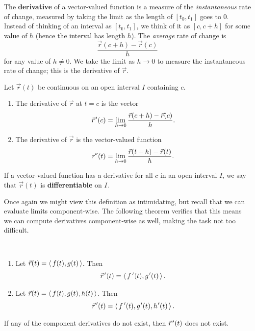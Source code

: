 The \textbf{derivative} of a vector-valued function is a measure of the \emph{instantaneous} rate of change, measured by taking the limit as the length of $[t_0,t_1]$ goes to 0. Instead of thinking of an interval as $[t_0,t_1]$, we think of it as $[c,c+h]$ for some value of $h$ (hence the interval has length $h$).  The \emph{average} rate of change is 
\[\frac{\vec r(c+h)-\vec r(c)}{h}\]
for any value of $h\neq0$. We take the limit as $h\to0$ to measure the instantaneous rate of change; this is the derivative of $\vec r$.


\begin{definition}\label{def:vvf_derivative}%
Let $\vec r(t)$ be continuous on an open interval $I$ containing $c$.
\begin{enumerate}
	\item The derivative of $\vec r$ at $t=c$ is the vector
	\[\vec r\hskip1.25pt ' (c) = \lim_{h\to 0} \frac{\vec r(c+h) - \vec r(c)}{h}.\]
	\item	The derivative of $\vec r$ is the vector-valued function
	\[\vec r\hskip1.25pt ' (t) = \lim_{h\to 0} \frac{\vec r(t+h) - \vec r(t)}{h}.\]
\end{enumerate}
\end{definition}


If a vector-valued function has a derivative for all $c$ in an open interval $I$, we say that $\vec r(t)$ is \textbf{differentiable} on $I$.

Once again we might view this definition as intimidating, but recall that we can evaluate limits component-wise. The following theorem verifies that this means we can compute derivatives component-wise as well, making the task not too difficult.

\begin{theorem}\label{thm:vvf_deriv}%
\mbox{}\\[-2\baselineskip]\parbox[t]{\linewidth}{\begin{enumerate}
	\item Let $\vec r(t) =\left\langle \, f(t), g(t)\,\right\rangle$. Then 
	\[\vrp(t) =\bracket{\, \fp(t), g\primeskip'(t)\,}.\]
	\item Let $\vec r(t) =\left\langle \, f(t), g(t), h(t)\,\right\rangle$. Then
	\[\vrp(t) =\bracket{\, \fp(t), g\primeskip'(t), h\primeskip'(t)\,}.\]
\end{enumerate}}
If any of the component derivatives do not exist, then $\vec r\hskip1.25pt '(t)$ does not exist.
\end{theorem}

